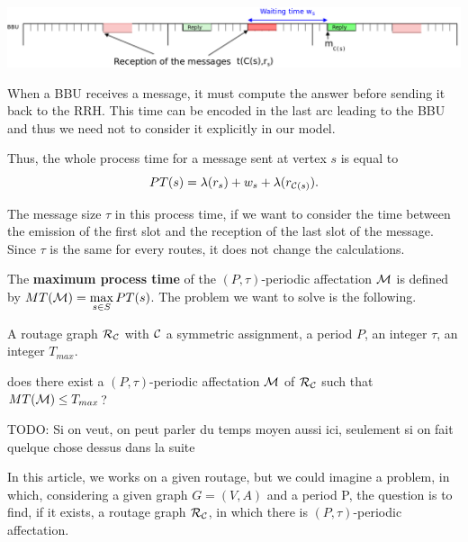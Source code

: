 \documentclass[a4paper,10pt]{article}
\newcommand{\todo}[1]{{\color{red} TODO: {#1}}}
\begin{document}
       \begin{center}
      \includegraphics[scale=0.3]{BBU2.png}
      \end{center}
     

      When a BBU receives a message, it must compute the answer before sending it back to the RRH. This time can be encoded
      in the last arc leading to the BBU and thus we need not to consider it explicitly in our model.
    
      Thus, the whole process time for a message sent at vertex $s$ is equal to
      $$
      PT(s)=\lambda(r_s)+ w_s+\lambda(r_{{\cal C}(s)}).
      $$
      
      The message size $\tau$ in this process time, if we want to consider the time between the emission of the first slot and the reception of the last slot of the message. Since $\tau$ is the same for every routes, it does not change the calculations.
      
    The {\bf maximum process time} of the $(P,\tau)$-periodic affectation ${\cal M} $ is defined by $MT({\cal M})=\max\limits_{s \in S} PT(s)$. The problem we want to solve is the following. 


        A routage graph ${\cal R}_{\cal C}$ with ${\cal C}$ a symmetric assignment, a period $P$, an integer $\tau$, an integer $T_{max}$.

       does there exist a $(P,\tau)$-periodic affectation ${\cal M}$ of ${\cal R}_{\cal C}$ such that $MT({\cal M}) \leq T_{max}$?

      \todo{Si on veut, on peut parler du temps moyen aussi ici, seulement si on fait quelque chose dessus dans la suite}



  In this article, we works on a given routage, but we could imagine a problem, in which, considering a given graph $G = (V,A)$ and a period P, the question is to find, if it exists, a routage graph ${\cal R}_{\cal C}$, in which there is $(P,\tau)$-periodic affectation.
  
\end{document}
